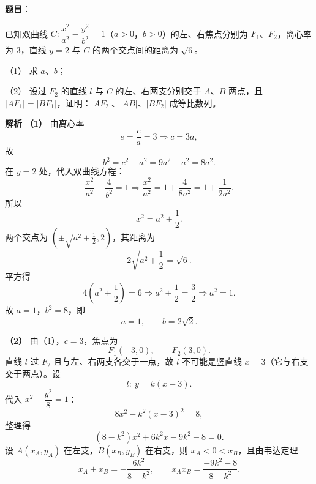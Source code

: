\begin{answer}

\textbf{题目}：

已知双曲线 $C:\dfrac{x^2}{a^2}-\dfrac{y^2}{b^2}=1$（$a>0$，$b>0$）的左、右焦点分别为 $F_1$、$F_2$，离心率为 $3$，直线 $y=2$ 与 $C$ 的两个交点间的距离为 $\sqrt6$。

（1） 求 $a$、$b$；

（2） 设过 $F_2$ 的直线 $l$ 与 $C$ 的左、右两支分别交于 $A$、$B$ 两点，且 $|AF_1|=|BF_1|$，证明：$|AF_2|$、$|AB|$、$|BF_2|$ 成等比数列。

\textbf{解析}
\textbf{（1）} 由离心率
\nopagebreak[4]
\[e=\frac ca=3\Longrightarrow c=3a,\]
故
\nopagebreak[4]
\[b^2=c^2-a^2=9a^2-a^2=8a^2.\]
在 $y=2$ 处，代入双曲线方程：
\nopagebreak[4]
\[\frac{x^2}{a^2}-\frac4{b^2}=1
\Longrightarrow \frac{x^2}{a^2}=1+\frac4{8a^2}
=1+\frac1{2a^2}.\]
所以
\nopagebreak[4]
\[x^2=a^2+\frac12.\]
两个交点为 $\left(\pm\sqrt{a^2+\frac12},2\right)$，其距离为
\nopagebreak[4]
\[2\sqrt{a^2+\frac12}=\sqrt6.\]
平方得
\nopagebreak[4]
\[4\left(a^2+\frac12\right)=6
\Longrightarrow a^2+\frac12=\frac32
\Longrightarrow a^2=1.\]
故 $a=1$，$b^2=8$，即
\nopagebreak[4]
\[a=1,\qquad b=2\sqrt2.\]

\textbf{（2）} 由（1），$c=3$，焦点为
\nopagebreak[4]
\[F_1(-3,0),\qquad F_2(3,0).\]
直线 $l$ 过 $F_2$ 且与左、右两支各交于一点，故 $l$ 不可能是竖直线 $x=3$（它与右支交于两点）。设
\nopagebreak[4]
\[l:\ y=k(x-3).\]
代入 $x^2-\dfrac{y^2}8=1$：
\nopagebreak[4]
\[8x^2-k^2(x-3)^2=8,\]
整理得
\nopagebreak[4]
\[(8-k^2)x^2+6k^2x-9k^2-8=0.\]
设 $A(x_A,y_A)$ 在左支，$B(x_B,y_B)$ 在右支，则 $x_A<0<x_B$，且由韦达定理
\nopagebreak[4]
\[x_A+x_B=-\frac{6k^2}{8-k^2},\qquad
x_Ax_B=\frac{-9k^2-8}{8-k^2}.\]


\end{answer}
